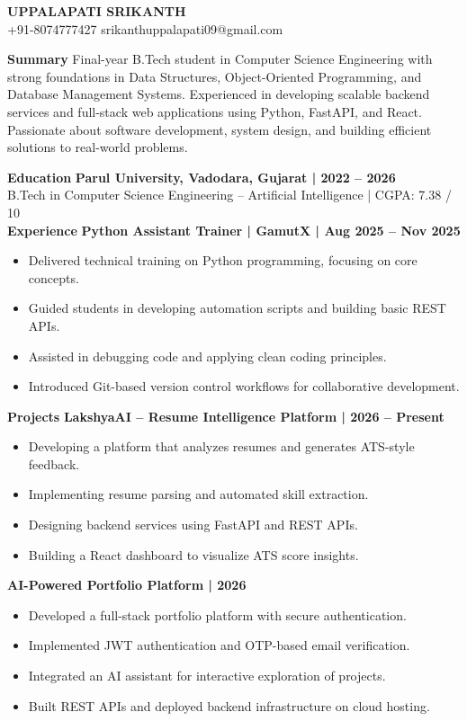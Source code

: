 \documentclass[10pt]{article}
\begin{document}
\begin{center}
    {\LARGE \textbf{UPPALAPATI SRIKANTH}} \\
    +91-8074777427 \textbar{} srikanthuppalapati09@gmail.com
\end{center}

\textbf{Summary}
Final-year B.Tech student in Computer Science Engineering with strong foundations in Data Structures, Object-Oriented Programming, and Database Management Systems. Experienced in developing scalable backend services and full-stack web applications using Python, FastAPI, and React. Passionate about software development, system design, and building efficient solutions to real-world problems.

\textbf{Education}
\textbf{Parul University, Vadodara, Gujarat | 2022 – 2026}\\
B.Tech in Computer Science Engineering – Artificial Intelligence | CGPA: 7.38 / 10\\

\textbf{Experience}
\textbf{Python Assistant Trainer | GamutX | Aug 2025 – Nov 2025}
\begin{itemize}
\item Delivered technical training on Python programming, focusing on core concepts.
\item Guided students in developing automation scripts and building basic REST APIs.
\item Assisted in debugging code and applying clean coding principles.
\item Introduced Git-based version control workflows for collaborative development.
\end{itemize}

\textbf{Projects}
\textbf{LakshyaAI – Resume Intelligence Platform | 2026 – Present}
\begin{itemize}
\item Developing a platform that analyzes resumes and generates ATS-style feedback.
\item Implementing resume parsing and automated skill extraction.
\item Designing backend services using FastAPI and REST APIs.
\item Building a React dashboard to visualize ATS score insights.
\end{itemize}

\textbf{AI-Powered Portfolio Platform | 2026}
\begin{itemize}
\item Developed a full-stack portfolio platform with secure authentication.
\item Implemented JWT authentication and OTP-based email verification.
\item Integrated an AI assistant for interactive exploration of projects.
\item Built REST APIs and deployed backend infrastructure on cloud hosting.
\end{itemize}
\end{document}
